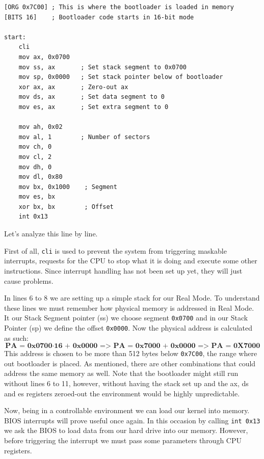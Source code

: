 \begin{lstlisting}[caption={Simple bootloader start in assembly}]
[ORG 0x7C00] ; This is where the bootloader is loaded in memory
[BITS 16]    ; Bootloader code starts in 16-bit mode

start:
    cli
    mov ax, 0x0700
    mov ss, ax       ; Set stack segment to 0x0700
    mov sp, 0x0000   ; Set stack pointer below of bootloader
    xor ax, ax       ; Zero-out ax
    mov ds, ax       ; Set data segment to 0
    mov es, ax       ; Set extra segment to 0

    mov ah, 0x02
    mov al, 1        ; Number of sectors
    mov ch, 0
    mov cl, 2
    mov dh, 0
    mov dl, 0x80
    mov bx, 0x1000    ; Segment
    mov es, bx
    xor bx, bx        ; Offset
    int 0x13
\end{lstlisting}
    
Let's analyze this line by line. 

First of all, \texttt{cli} is used to prevent the system from triggering maskable interrupts,
requests for the CPU to stop what it is doing and execute some other instructions.
Since interrupt handling has not been set up yet, they will just cause problems.

In lines 6 to 8 we are setting up a simple stack for our Real Mode. To understand these lines we must
remember how physical memory is addressed in Real Mode. It our Stack Segment pointer (ss) we choose segment \texttt{0x0700}
and in our Stack Pointer (sp) we define the offset \texttt{0x0000}. Now the physical address is calculated as such:
\[
\textbf{PA = 0x0700} \cdot \textbf{16 + 0x0000}
\textbf{ => PA = 0x7000 + 0x0000}
\textbf{    => PA = 0X7000}
\]
This address is chosen to be more than 512 bytes below \texttt{0x7C00}, the range where out bootloader is placed.
As mentioned, there are other combinations that could address the same memory as well.
Note that the bootloader might still run without lines 6 to 11, however, without having the stack set up
and the ax, ds and es registers zeroed-out the environment would be highly unpredictable.

Now, being in a controllable environment we can load our kernel into memory. BIOS interrupts will prove useful once again.
In this occasion by calling \texttt{int 0x13} we ask the BIOS to load data from our hard drive into our memory. 
However, before triggering the interrupt we must pass some parameters through CPU registers.

